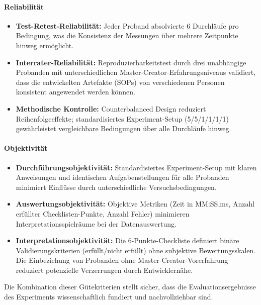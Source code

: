 \paragraph{Reliabilität}

\begin{itemize}
    \item \textbf{Test-Retest-Reliabilität:} Jeder Proband absolvierte 6 Durchläufe pro Bedingung, was die Konsistenz der Messungen über mehrere Zeitpunkte hinweg ermöglicht.

    \item \textbf{Interrater-Reliabilität:} Reproduzierbarkeitstest durch drei unabhängige Probanden mit unterschiedlichen Master-Creator-Erfahrungsniveaus validiert, dass die entwickelten Artefakte (SOPs) von verschiedenen Personen konsistent angewendet werden können.

    \item \textbf{Methodische Kontrolle:} Counterbalanced Design reduziert Reihenfolgeeffekte; standardisiertes Experiment-Setup (5/5/1/1/1/1) gewährleistet vergleichbare Bedingungen über alle Durchläufe hinweg.
\end{itemize}

\paragraph{Objektivität}

\begin{itemize}
    \item \textbf{Durchführungsobjektivität:} Standardisiertes Experiment-Setup mit klaren Anweisungen und identischen Aufgabenstellungen für alle Probanden minimiert Einflüsse durch unterschiedliche Versuchsbedingungen.

    \item \textbf{Auswertungsobjektivität:} Objektive Metriken (Zeit in MM:SS,ms, Anzahl erfüllter Checklisten-Punkte, Anzahl Fehler) minimieren Interpretationsspielräume bei der Datenauswertung.

    \item \textbf{Interpretationsobjektivität:} Die 6-Punkte-Checkliste definiert binäre Validierungskriterien (erfüllt/nicht erfüllt) ohne subjektive Bewertungsskalen. Die Einbeziehung von Probanden ohne Master-Creator-Vorerfahrung reduziert potenzielle Verzerrungen durch Entwicklernähe.
\end{itemize}

Die Kombination dieser Gütekriterien stellt sicher, dass die Evaluationsergebnisse des Experiments wissenschaftlich fundiert und nachvollziehbar sind.


